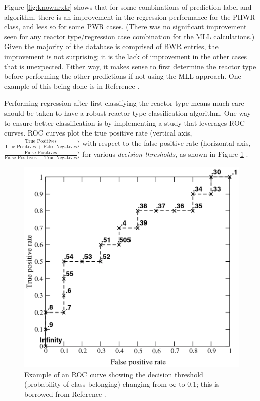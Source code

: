 Figure \ref{fig:knownrxtr} shows that for some combinations of prediction label
and algorithm, there is an improvement in the regression performance for the
\gls{PHWR} class, and less so for some \gls{PWR} cases.  (There was no
significant improvement seen for any reactor type/regression case combination
for the \gls{MLL} calculations.) Given the majority of the database is
comprised of \gls{BWR} entries, the improvement is not surprising; it is the
lack of improvement in the other cases that is unexpected. Either way, it makes
sense to first determine the reactor type before performing the other
predictions if not using the \gls{MLL} approach. One example of this being
done is in Reference \cite{serial_ml}.

Performing regression after first classifying the reactor type means much care
should be taken to have a robust reactor type classification algorithm. One way
to ensure better classification is by implementing a study that leverages
\gls{ROC} curves. \Gls{ROC} curves plot the true positive rate (vertical axis,
$\frac{\text{True Positives}}{\text{True Positives + False Negatives}}$) with
respect to the false positive rate (horizontal axis, $\frac{\text{False
Positives}}{\text{False Positives + True Negatives}}$) for various
\textit{decision thresholds}, as shown in Figure \ref{fig:roc} \cite{roc}.

\begin{figure}[!htb]
  \centering
  \includegraphics[width=0.8\linewidth]{./chapters/concl/roc.png}
  \caption[Example of an \acrshort{ROC} curve]
          {Example of an \acrshort{ROC} curve showing the decision threshold 
           (probability of class belonging) changing from $\infty$ to 0.1; this 
           is borrowed from Reference \cite{roc}.}
  \label{fig:roc}
\end{figure}

